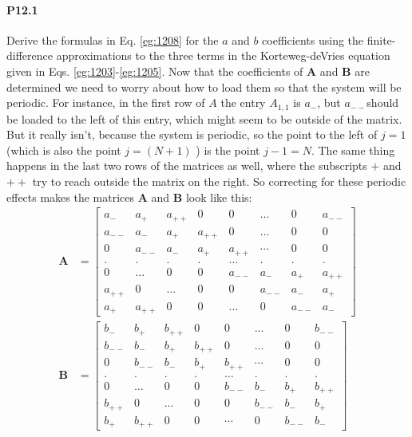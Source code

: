 \documentclass{book}
\theoremstyle{plain}
\theoremstyle{definition}
\numberwithin{exm}{chapter}
\theoremstyle{remark}
\theoremstyle{summary}
\theoremstyle{overview}
\begin{document}
\paragraph*{P12.1}
Derive the formulas in Eq. \eqref{eg:1208} for the $a$ and $b$ coefficients using the finite-difference approximations to the three terms in the Korteweg-deVries equation given in Eqs. \eqref{eg:1203}-\eqref{eg:1205}.
Now that the coefficients of $\mathbf{A}$ and $\mathbf{B}$ are determined we need to worry about how to load them so that the system will be periodic. For instance, in the first row of $A$ the entry $A_{1,1}$ is $a_{-}$, but $a_{--}$should be loaded to the left of this entry, which might seem to be outside of the matrix. But it really isn\rq t, because the system is periodic, so the point to the left of $j=1$ (which is also the point $j=(N+1)$ ) is the point $j-1=N$. The same thing happens in the last two rows of the matrices as well, where the subscripts $+$ and $++$ try to reach outside the matrix on the right. So correcting for these periodic effects makes the matrices $\mathbf{A}$ and $\mathbf{B}$ look like this:
\begin{equation}\label{eq:1209}
\begin{aligned}
\mathbf{A} &=\left[\begin{array}{cccccccc}
a_{-} & a_{+} & a_{++} & 0 & 0 & \ldots & 0 & a_{--} \\
a_{--} & a_{-} & a_{+} & a_{++} & 0 & \ldots & 0 & 0 \\
0 & a_{--} & a_{-} & a_{+} & a_{++} & \cdots & 0 & 0 \\
. & . & . & . & \ldots & . & . & . \\
0 & \ldots & 0 & 0 & a_{--} & a_{-} & a_{+} & a_{++} \\
a_{++} & 0 & \ldots & 0 & 0 & a_{--} & a_{-} & a_{+} \\
a_{+} & a_{++} & 0 & 0 & \ldots & 0 & a_{--} & a_{-}
\end{array}\right] \\
\mathbf{B} &=\left[\begin{array}{cccccccc}
b_{-} & b_{+} & b_{++} & 0 & 0 & \ldots & 0 & b_{--} \\
b_{--} & b_{-} & b_{+} & b_{++} & 0 & \ldots & 0 & 0 \\
0 & b_{--} & b_{-} & b_{+} & b_{++} & \cdots & 0 & 0 \\
. & . & . & . & \ldots & . & . & . \\
0 & \ldots & 0 & 0 & b_{--} & b_{-} & b_{+} & b_{++} \\
b_{++} & 0 & \ldots & 0 & 0 & b_{--} & b_{-} & b_{+} \\
b_{+} & b_{++} & 0 & 0 & \cdots & 0 & b_{--} & b_{-}
\end{array}\right]
\end{aligned}
\end{equation}
\end{document}
